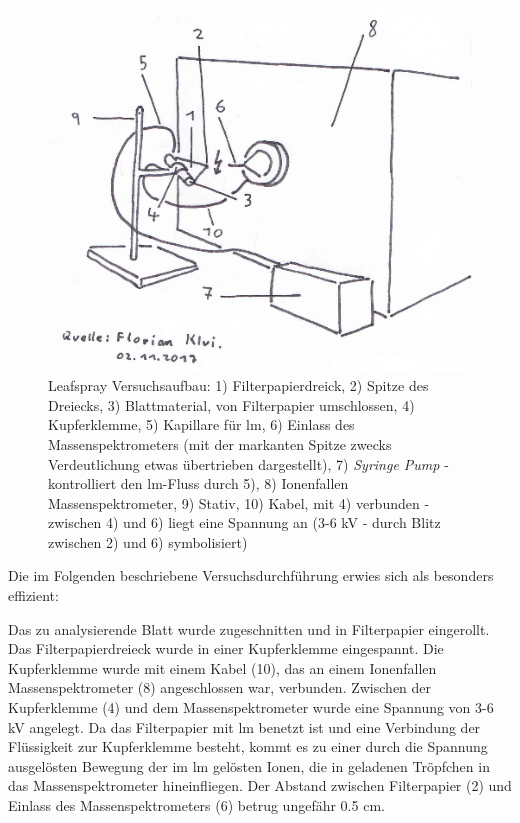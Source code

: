 \documentclass[12pt,a4paper]{article}
\begin{document}
\begin{figure}[!hbtp]
  \centering
  \includegraphics[scale=0.5]{figures/Kapitel4/VWA_MSLeafspray_Versuchsaufbau.png}
  \caption[MS Leafspray Versuchsaufbau, Quelle: Autor]{Leafspray Versuchsaufbau: 1) Filterpapierdreick, 2) Spitze des Dreiecks, 3) Blattmaterial, von Filterpapier umschlossen, 4) Kupferklemme, 5) Kapillare für \gls{lm}, 6) Einlass des Massenspektrometers (mit der markanten Spitze zwecks Verdeutlichung etwas übertrieben dargestellt), 7) \textit{Syringe Pump} - kontrolliert den \gls{lm}-Fluss durch 5), 8) Ionenfallen Massenspektrometer, 9) Stativ, 10) Kabel, mit 4) verbunden - zwischen 4) und 6) liegt eine Spannung   an (3-6 kV - durch Blitz zwischen 2) und 6) symbolisiert)}
  \label{fig:LeafsprayVersuchsaufbau}
\end{figure}

Die im Folgenden beschriebene Versuchsdurchführung erwies sich als besonders effizient:

Das zu analysierende Blatt wurde zugeschnitten und in Filterpapier eingerollt. Das Filterpapierdreieck wurde in einer Kupferklemme eingespannt. Die Kupferklemme wurde mit einem Kabel (10), das an einem Ionenfallen Massenspektrometer (8) angeschlossen war, verbunden. Zwischen der Kupferklemme (4) und dem Massenspektrometer wurde eine Spannung von 3-6 kV angelegt. Da das Filterpapier mit \gls{lm} benetzt ist und eine Verbindung der Flüssigkeit zur Kupferklemme besteht, kommt es zu einer durch die Spannung ausgelösten Bewegung der im \gls{lm} gelösten Ionen, die in geladenen Tröpfchen in das Massenspektrometer hineinfliegen. Der Abstand zwischen Filterpapier (2) und Einlass des Massenspektrometers (6) betrug ungefähr 0.5 cm.
\end{document}
